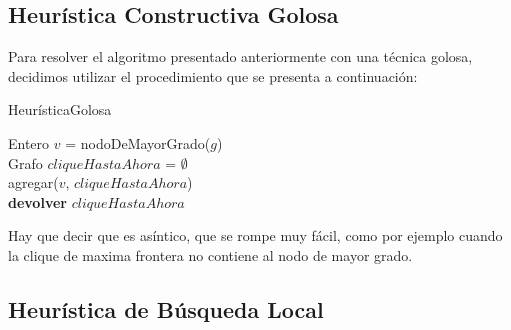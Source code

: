 \subsection{Heurística Constructiva Golosa}
Para resolver el algoritmo presentado anteriormente con una técnica golosa, decidimos utilizar el procedimiento que se presenta a continuación:\newline
\newline
\begin{algorithm}[H]
    \SetAlgoLined
    \caption{HeurísticaGolosa}
	Entero $v$ = nodoDeMayorGrado($g$)\\
	Grafo $cliqueHastaAhora$ = $\emptyset$\\
	agregar($v$, $cliqueHastaAhora$)\\
\textbf{devolver} $cliqueHastaAhora$
\end{algorithm}

Hay que decir que es asíntico, que se rompe muy fácil, como por ejemplo cuando la clique de maxima frontera no contiene al nodo de mayor grado.

\subsection{Heurística de Búsqueda Local}

